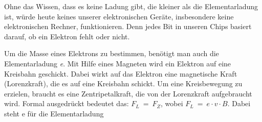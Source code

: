 Ohne das Wissen, dass es keine Ladung gibt, die kleiner als die Elementarladung ist, würde heute keines unserer elektronischen Geräte, insbesondere keine elektronischen Rechner, funktionieren. Denn jedes Bit in unseren Chips basiert darauf, ob ein Elektron fehlt oder nicht.

Um die Masse eines Elektrons zu bestimmen, benötigt man auch die Elementarladung \textit{e}. Mit Hilfe eines Magneten wird ein Elektron auf eine Kreisbahn geschickt. Dabei wirkt auf das Elektron eine magnetische Kraft (Lorenzkraft), die es auf eine Kreisbahn schickt. Um eine Kreisbewegung zu erzielen, braucht es eine Zentripetalkraft, die von der Lorenzkraft aufgebraucht wird. Formal ausgedrückt bedeutet das: $F_L \ = \ F_Z$, wobei $F_L \ = \ e \cdot v \cdot B$. Dabei steht e für die Elementarladung

   
